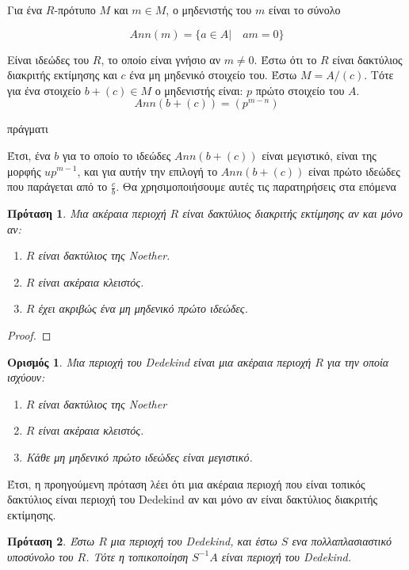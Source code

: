 \documentclass[oneside,a4paper]{article}
\newtheorem*{defn}{Ορισμός}
\newtheorem{prop}{Πρόταση}
\newcommand {\tl}{\textlatin}
\begin{document}
Για ένα $R$-πρότυπο $M$ και $m \in M$, ο μηδενιστής του $m$ είναι το σύνολο

$$Ann(m) = \{a \in A| \quad am  = 0 \}$$

Είναι ιδεώδες του $R$, το οποίο είναι γνήσιο αν $m\neq 0$. Έστω ότι το $R$ είναι δακτύλιος διακριτής εκτίμησης και $c$ ένα μη μηδενικό στοιχείο του. Έστω $M=A/(c)$. Τότε για ένα στοιχείο $b + (c) \in M$ ο μηδενιστής είναι: 
$p$ πρώτο στοιχείο του $A$.
$$Ann(b + (c)) = (p^{m-n})$$

πράγματι

Έτσι, ένα $b$ για το οποίο το ιδεώδες $Ann(b+ (c))$ είναι μεγιστικό, είναι της μορφής $u p^{m-1}$, και για αυτήν την επιλογή το $Ann(b+(c))$ είναι πρώτο ιδεώδες που παράγεται από το $\frac{c}{b}$. Θα χρησιμοποιήσουμε αυτές τις παρατηρήσεις στα επόμενα


\begin{prop}Μια ακέραια περιοχή $R$ είναι δακτύλιος διακριτής εκτίμησης αν και μόνο αν:
	\begin{enumerate}
		\item $R$ είναι δακτύλιος της \tl{Noether}.
		\item $R$ είναι ακέραια κλειστός.
		\item $R$ έχει ακριβώς ένα μη μηδενικό πρώτο ιδεώδες.
	\end{enumerate}
\end{prop}
\begin{proof}
\end{proof}

\begin{defn}
	Μια περιοχή του \tl{Dedekind} είναι μια ακέραια περιοχή $R$ για την οποία ισχύουν:
	\begin{enumerate}
		\item $R$ είναι δακτύλιος της \tl{Noether}
		\item $R$ είναι ακέραια κλειστός.
		\item Κάθε μη μηδενικό πρώτο ιδεώδες είναι μεγιστικό.
	\end{enumerate}
\end{defn}

Έτσι, η προηγούμενη πρόταση λέει ότι μια ακέραια περιοχή που είναι τοπικός δακτύλιος είναι περιοχή του \tl{Dedekind} αν και μόνο αν είναι δακτύλιος διακριτής εκτίμησης.



\begin{prop}
	Έστω $R$ μια περιοχή του \tl{Dedekind}, και έστω $S$ ενα πολλαπλασιαστικό υποσύνολο του $R$. Τότε η τοπικοποίηση $S^{-1} A$ είναι περιοχή του \tl{Dedekind}.
\end{prop}
\end{document}
